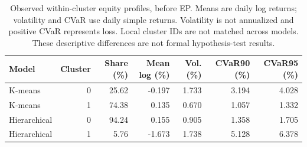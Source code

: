 \begin{table}[htbp]
\centering
\footnotesize
\begin{tabularx}{\textwidth}{@{}Xrrrrrr@{}}
\toprule
Model & Cluster & Share (\%) & Mean log (\%) & Vol. (\%) & CVaR90 (\%) & CVaR95 (\%)\\
\midrule
K-means & 0 & 25.62 & -0.197 & 1.733 & 3.194 & 4.028\\
K-means & 1 & 74.38 & 0.135 & 0.670 & 1.057 & 1.332\\
Hierarchical & 0 & 94.24 & 0.155 & 0.905 & 1.358 & 1.705\\
Hierarchical & 1 & 5.76 & -1.673 & 1.738 & 5.128 & 6.378\\
\bottomrule
\end{tabularx}
\caption{Observed within-cluster equity profiles, before EP. Means are daily log returns; volatility and CVaR use daily simple returns. Volatility is not annualized and positive CVaR represents loss. Local cluster IDs are not matched across models. These descriptive differences are not formal hypothesis-test results.}
\label{tab:fixed11-observed-profiles}
\end{table}

